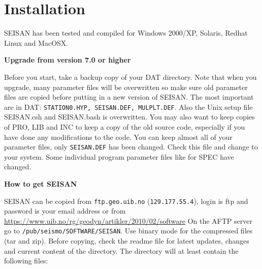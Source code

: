 

\chapter{Installation}
\label{chap:installation}

SEISAN has been tested and compiled for Windows 2000/XP, 
Solaris, Redhat Linux and MacOSX.

\textbf{Upgrade from version 7.0 or higher}

Before you start, take a backup copy of your DAT directory. Note that 
when you upgrade, many parameter files will be overwritten so make 
sure old parameter files are copied before putting in a new version 
of SEISAN. The most important are in DAT: 
\texttt{STATION0.HYP, SEISAN.DEF, MULPLT.DEF}. 
Also the Unix setup file 
SEISAN.csh and SEISAN.bash is overwritten. 
You may also want 
to keep copies of PRO, LIB and INC to keep a copy of the old source 
code, especially if you have done any modifications to the code. 
You can keep almost all of your parameter files, only \texttt{SEISAN.DEF} 
has been changed. Check this file and change to your system. Some individual program parameter files like for SPEC have changed. 

\textbf{How to get SEISAN}

SEISAN can be copied from \texttt{ftp.geo.uib.no} (\texttt{129.177.55.4}), 
login is ftp and password is your email address or from 
\url{https://www.uib.no/rg/geodyn/artikler/2010/02/software}
On the 
AFTP server go to \texttt{/pub/seismo/SOFTWARE/SEISAN}. Use binary 
mode for the compressed files (tar and zip). Before copying, check 
the readme file for latest updates, changes and current content of 
the directory. The directory will at least contain the following files: 

